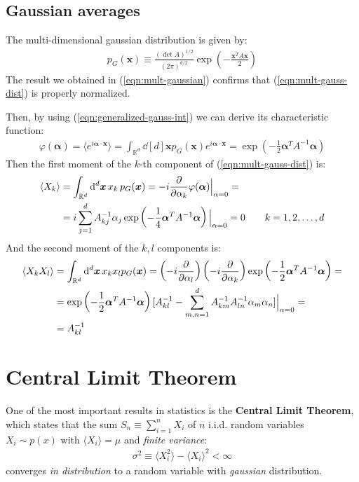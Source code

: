 \documentclass[../template.tex]{subfiles}
\begin{document}
\subsection{Gaussian averages}
The multi-dimensional gaussian distribution is given by:
\begin{align} \label{eqn:mult-gauss-dist}
    p_G(\bm{x}) \equiv \frac{(\operatorname{det}A)^{1/2}}{(2 \pi)^{d/2}} \exp\left(-\frac{\bm{x}^T A \bm{x}}{2} \right)
\end{align}
The result we obtained in (\ref{eqn:mult-gaussian}) confirms that (\ref{eqn:mult-gauss-dist}) is properly normalized.

\medskip

Then, by using (\ref{eqn:generalized-gauss-int}) we can derive its characteristic function:
\begin{align*}
    \varphi(\bm{\alpha}) = \langle e^{i \bm{\alpha}\cdot \bm{x}} \rangle = \int_{\mathbb{R}^d} \dd[d]{\bm{x}} p_G(\bm{x}) e^{i \bm{\alpha} \cdot \bm{x}} = \exp\left(-\frac{1}{2} \bm{\alpha}^T A^{-1} \bm{\alpha} \right)
\end{align*}
Then the first moment of the $k$-th component of (\ref{eqn:mult-gauss-dist}) is:
\begin{align*} %
    \langle X_k \rangle &= \int_{\mathbb{R}^d} \dd[d]{\bm{x}} x_k \,p_G(\bm{x}) = -i \pdv{\alpha_k} \varphi(\bm{\alpha})\Big|_{\alpha = 0} =\\
    &= i \sum_{j=1}^d A_{kj}^{-1} \alpha_j \exp\left(-\frac{1}{4} \bm{\alpha}^T A^{-1} \bm{\alpha} \right) \Big|_{\alpha = 0} = 0 \qquad k=1,2,\dots,d
\end{align*}
And the second moment of the $k,l$ components is:
\begin{align*}
    \langle X_k X_l \rangle &= \int_{\mathbb{R}^d} \dd[d]{\bm{x}} x_k x_l p_G(\bm{x}) = \left(-i\pdv{\alpha_l}\right)\left(-i \pdv{\alpha_k}\right) \exp\left(-\frac{1}{2} \bm{\alpha}^T A^{-1} \bm{\alpha} \right)=\\
    &=\exp\left(-\frac{1}{2} \bm{\alpha}^T A^{-1} \bm{\alpha} \right) [A^{-1}_{kl} - \sum_{m,n=1}^d A^{-1}_{km} A^{-1}_{ln} \alpha_m \alpha_n] \Big|_{\alpha=0}=\\
    &= A^{-1}_{kl}
\end{align*}

\section{Central Limit Theorem}
One of the most important results in statistics is the \textbf{Central Limit Theorem}, which states that the sum $S_n \equiv \sum_{i=1}^n X_i$ of $n$ i.i.d. random variables $X_i \sim p(x)$ with $\langle X_i \rangle = \mu$ and \textit{finite variance}:
\begin{align*}
    \sigma^2 \equiv \langle X_i^2 \rangle - \langle X_i \rangle^2 < \infty
\end{align*} 
converges \textit{in distribution} to a random variable with \textit{gaussian} distribution.  
\end{document}
